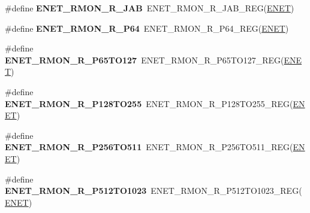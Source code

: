 \begin{DoxyCompactItemize}
\item 
\#define {\bfseries E\+N\+E\+T\+\_\+\+R\+M\+O\+N\+\_\+\+R\+\_\+\+J\+AB}~E\+N\+E\+T\+\_\+\+R\+M\+O\+N\+\_\+\+R\+\_\+\+J\+A\+B\+\_\+\+R\+EG(\hyperlink{group__ENET__Peripheral__Access__Layer_ga4745105f505f3ab949d6a57fbe2a0ed5}{E\+N\+ET})\hypertarget{group__ENET__Register__Accessor__Macros_gac89cfeeea3d6804f8e5e5ec467472b7e}{}\label{group__ENET__Register__Accessor__Macros_gac89cfeeea3d6804f8e5e5ec467472b7e}

\item 
\#define {\bfseries E\+N\+E\+T\+\_\+\+R\+M\+O\+N\+\_\+\+R\+\_\+\+P64}~E\+N\+E\+T\+\_\+\+R\+M\+O\+N\+\_\+\+R\+\_\+\+P64\+\_\+\+R\+EG(\hyperlink{group__ENET__Peripheral__Access__Layer_ga4745105f505f3ab949d6a57fbe2a0ed5}{E\+N\+ET})\hypertarget{group__ENET__Register__Accessor__Macros_ga358714bb5af0b88fa0754074684960f1}{}\label{group__ENET__Register__Accessor__Macros_ga358714bb5af0b88fa0754074684960f1}

\item 
\#define {\bfseries E\+N\+E\+T\+\_\+\+R\+M\+O\+N\+\_\+\+R\+\_\+\+P65\+T\+O127}~E\+N\+E\+T\+\_\+\+R\+M\+O\+N\+\_\+\+R\+\_\+\+P65\+T\+O127\+\_\+\+R\+EG(\hyperlink{group__ENET__Peripheral__Access__Layer_ga4745105f505f3ab949d6a57fbe2a0ed5}{E\+N\+ET})\hypertarget{group__ENET__Register__Accessor__Macros_ga3a41b9ac512a20e1a99638ef76b9f2fa}{}\label{group__ENET__Register__Accessor__Macros_ga3a41b9ac512a20e1a99638ef76b9f2fa}

\item 
\#define {\bfseries E\+N\+E\+T\+\_\+\+R\+M\+O\+N\+\_\+\+R\+\_\+\+P128\+T\+O255}~E\+N\+E\+T\+\_\+\+R\+M\+O\+N\+\_\+\+R\+\_\+\+P128\+T\+O255\+\_\+\+R\+EG(\hyperlink{group__ENET__Peripheral__Access__Layer_ga4745105f505f3ab949d6a57fbe2a0ed5}{E\+N\+ET})\hypertarget{group__ENET__Register__Accessor__Macros_gaaef2afce7e061100f21ed17b33452abe}{}\label{group__ENET__Register__Accessor__Macros_gaaef2afce7e061100f21ed17b33452abe}

\item 
\#define {\bfseries E\+N\+E\+T\+\_\+\+R\+M\+O\+N\+\_\+\+R\+\_\+\+P256\+T\+O511}~E\+N\+E\+T\+\_\+\+R\+M\+O\+N\+\_\+\+R\+\_\+\+P256\+T\+O511\+\_\+\+R\+EG(\hyperlink{group__ENET__Peripheral__Access__Layer_ga4745105f505f3ab949d6a57fbe2a0ed5}{E\+N\+ET})\hypertarget{group__ENET__Register__Accessor__Macros_ga42a4dce30341d5f9b2e76f53c27638c8}{}\label{group__ENET__Register__Accessor__Macros_ga42a4dce30341d5f9b2e76f53c27638c8}

\item 
\#define {\bfseries E\+N\+E\+T\+\_\+\+R\+M\+O\+N\+\_\+\+R\+\_\+\+P512\+T\+O1023}~E\+N\+E\+T\+\_\+\+R\+M\+O\+N\+\_\+\+R\+\_\+\+P512\+T\+O1023\+\_\+\+R\+EG(\hyperlink{group__ENET__Peripheral__Access__Layer_ga4745105f505f3ab949d6a57fbe2a0ed5}{E\+N\+ET})\hypertarget{group__ENET__Register__Accessor__Macros_ga9c05f6cd159acd6a4c5d0b36b8a41252}{}\label{group__ENET__Register__Accessor__Macros_ga9c05f6cd159acd6a4c5d0b36b8a41252}


\end{DoxyCompactItemize}
